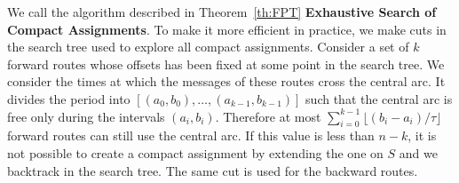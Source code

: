 \documentclass[10pt, conference, letterpaper]{IEEEtran}
\begin{document}
We call the algorithm described in Theorem~\ref{th:FPT} \textbf{Exhaustive Search of Compact Assignments}. To make it more efficient in practice, we make cuts in the search tree used to explore all compact assignments. Consider a set of $k$ forward routes whose offsets has been fixed at some point in the search tree. We consider the times at which the messages of these routes cross the central arc. It divides the period into $[(a_0,b_0), \dots, (a_{k-1},b_{k-1})]$ such that the central arc is free only during the intervals $(a_i,b_i)$. Therefore at most $\displaystyle{ \sum_{i=0}^{k-1} \lfloor(b_{i} -a_i)/\tau\rfloor} $ forward routes can still use the central arc. If this value is less than $n - k$, it is not possible to create a compact assignment by extending the one on $S$ and we backtrack in the search tree. The same cut is used for the backward routes.
% 
%       
\end{document}
